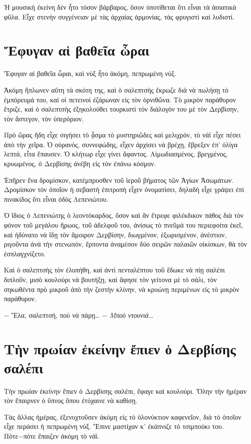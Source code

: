 \documentclass[11pt]{article}
\begin{document}
Ἡ μουσικὴ ἐκείνη δὲν ἦτο τόσον βάρβαρος, ὅσον ὑποτίθεται ὅτι εἶναι τὰ ἀσιατικὰ φῦλα. Εἶχε στενὴν συγγένειαν μὲ τὰς ἀρχαίας ἁρμονίας, τὰς φρυγιστὶ καὶ λυδιστί.

\section{Ἔφυγαν αἱ βαθεῖα ὧραι}
\label{sec:orgc1253b7}
Ἔφυγαν αἱ βαθεῖα ὧραι, καὶ νὺξ ἦτο ἀκόμη, πεπρωμένη νύξ.

Ἀκόμη ἥπλωνεν αὕτη τὰ σκότη της, καὶ ὁ σαλεπτσὴς ἔκρωζε διὰ νὰ πωλήσῃ τὸ ἐμπόρευμά του, καὶ οἱ πετεινοὶ ἐζάρωναν εἰς τὸν ὀρνιθῶνα. Τὸ μικρὸν παράθυρον ἔτριζε, καὶ ὁ σαλεπτσὴς ἐξηκολούθει τουρκιστὶ τὸν διάλογόν του μὲ τὸν Δερβίσην, τὸν ἄστεγον, τὸν ὑπερόριον.

Πρὸ ὥρας ἤδη εἶχε σιγήσει τὸ ᾆσμα τὸ μυστηριῶδες καὶ μελιχρόν, τὸ νάϊ εἶχε πέσει ἀπὸ τὴν χεῖρα. Ὁ οὐρανός, συννεφώδης, εἶχεν ἀρχίσει νὰ βρέχῃ, ἔβρεξεν ἐπ' ὀλίγα λεπτά, εἶτα ἔπαυσεν. Ὁ κλήτωρ εἶχε γίνει ἄφαντος. Αἱμωδιασμένος, βρεγμένος, κρυωμένος, ὁ Δερβίσης ἀνέβη εἰς τὸν ἐπάνω κόσμον.

Ἐπῆρεν ἕνα δρομίσκον, κατέμπροσθεν τοῦ ἱεροῦ βήματος τῶν Ἁγίων Ἀσωμάτων. Δρομίσκον τὸν ὁποῖον ἡ σεβαστὴ ἐπιτροπὴ εἶχεν ὀνοματίσει, δηλαδὴ εἶχε γράψει ἐπὶ πινακίδος ὅτι εἶναι ὁδὸς Λεπενιώτου.

Ὁ ἴδιος ὁ Λεπενιώτης ὁ λεοντόκαρδος, ὅσον καὶ ἂν ἔτρεφε φιλέκδικον πάθος διὰ τὸν φόνον τοῦ μεγάλου ἥρωος, τοῦ ἀδελφοῦ του, ἀνίσως τὸ πνεῦμά του περιεφοίτα ἐκεῖ, καὶ ἠδύνατο νὰ ἴδῃ τὸν ἄμοιρον Δερβίσην, διωγμένον, ἐξωρισμένον, ἀνέστιον, ριγοῦντα ἀνὰ τὴν στενωπόν, ἕρποντα ἀναμέσον δύο σειρῶν παλαιῶν οἰκίσκων, θὰ τὸν ἐσπλαγχνίζετο.

Καὶ ὁ σαλεπτσὴς τὸν ἐλυπήθη, καὶ ἀντὶ πενταλέπτου τοῦ ἔδωκε νὰ πίῃ σαλέπι διπλοῦν, μισὸ κουλούρι νὰ βουτήξῃ, καὶ ἄφησε τὸν γείτονα μὲ τὸ σάλι, τὸν σηκωθέντα πρὸ μικροῦ ἀπὸ τὴν ζεστὴν κλίνην, νὰ κρυώνῃ περιμένων εἰς τὸ μικρὸν παράθυρον.

− Ἔλα, σαλεπτσή, ποὺ νὰ πάρῃ…
− \emph{Μποὺ ντουνιά…}

\section{Τὴν πρωίαν ἐκείνην ἔπιεν ὁ Δερβίσης σαλέπι}
\label{sec:org436016f}
Τὴν πρωίαν ἐκείνην ἔπιεν ὁ Δερβίσης σαλέπι, ἔφαγε καὶ κουλούρι. Ὅλην τὴν ἡμέραν τὸν ἔπαιρνεν ὁ ὕπνος ὅπου ἐτύχαινε νὰ καθίσῃ.

Τὰς ἄλλας ἡμέρας, ἐξενυχτοῦσεν ἀκόμη εἰς τὸ ὁλονύκτιον καφενεῖον, διὰ τὸ ὁποῖον εἶχε περάσει ἡ πεπρωμένη νύξ. Ἔπινε μαστίχαν κ' ἐκάπνιζε τὸ τσιμπούκι του. Πότε−πότε ἔπαιζεν ἀκόμη τὸ νάϊ.
\end{document}
